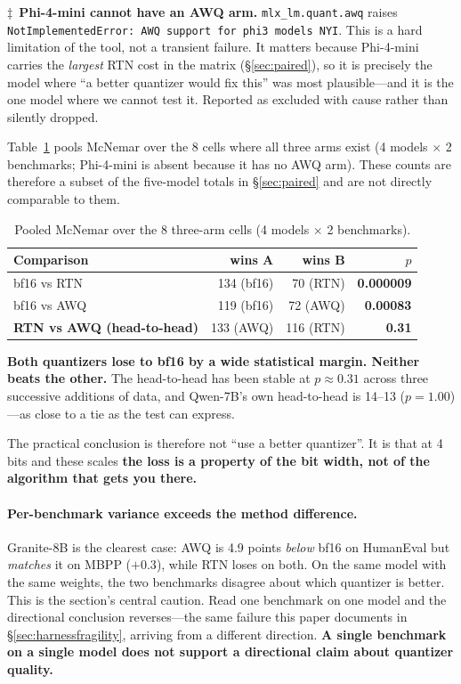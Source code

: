 \documentclass[11pt]{article}
\begin{document}
$\ddagger$~\textbf{Phi-4-mini cannot have an AWQ arm.} \texttt{mlx\_lm.quant.awq} raises
\texttt{NotImplementedError: AWQ support for phi3 models NYI}. This is a hard limitation
of the tool, not a transient failure. It matters because Phi-4-mini carries the
\emph{largest} RTN cost in the matrix (\S\ref{sec:paired}), so it is precisely the model
where ``a better quantizer would fix this'' was most plausible---and it is the one model
where we cannot test it. Reported as excluded with cause rather than silently dropped.

Table~\ref{tab:mcnemar} pools McNemar over the 8 cells where all three arms exist (4
models $\times$ 2 benchmarks; Phi-4-mini is absent because it has no AWQ arm). These
counts are therefore a subset of the five-model totals in \S\ref{sec:paired} and are not
directly comparable to them.

\begin{table}[h]
  \centering
  \caption{Pooled McNemar over the 8 three-arm cells (4 models $\times$ 2 benchmarks).}
  \label{tab:mcnemar}
  \smallskip
  \begin{tabular}{lrrr}
    \toprule
    Comparison & wins A & wins B & $p$ \\
    \midrule
    bf16 vs RTN & 134 (bf16) & 70 (RTN) & \textbf{0.000009} \\
    bf16 vs AWQ & 119 (bf16) & 72 (AWQ) & \textbf{0.00083} \\
    \textbf{RTN vs AWQ (head-to-head)} & 133 (AWQ) & 116 (RTN) & \textbf{0.31} \\
    \bottomrule
  \end{tabular}
\end{table}

\textbf{Both quantizers lose to bf16 by a wide statistical margin. Neither beats the
other.} The head-to-head has been stable at $p \approx 0.31$ across three successive
additions of data, and Qwen-7B's own head-to-head is 14--13 ($p = 1.00$)---as close to a
tie as the test can express.

The practical conclusion is therefore not ``use a better quantizer''. It is that at 4
bits and these scales \textbf{the loss is a property of the bit width, not of the
algorithm that gets you there.}

\paragraph{Per-benchmark variance exceeds the method difference.} Granite-8B is the
clearest case: AWQ is 4.9 points \emph{below} bf16 on HumanEval but \emph{matches} it on
MBPP ($+0.3$), while RTN loses on both. On the same model with the same weights, the two
benchmarks disagree about which quantizer is better. This is the section's central
caution. Read one benchmark on one model and the directional conclusion reverses---the
same failure this paper documents in \S\ref{sec:harnessfragility}, arriving from a
different direction. \textbf{A single benchmark on a single model does not support a
directional claim about quantizer quality.}
\end{document}
